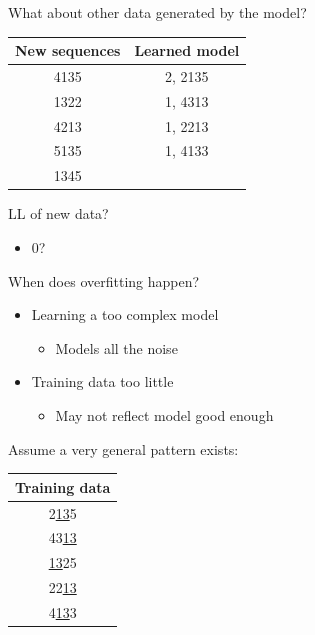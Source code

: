 \begin{frame}
What about other data generated by the model?
\begin{table}[h]
\begin{tabular}{cc}
\textbf{New sequences}     & \multicolumn{1}{l}{\textbf{Learned model}} \\ \hline
\multicolumn{1}{|c|}{4135} & \multicolumn{1}{c|}{2, 2135}                  \\ \hline
\multicolumn{1}{|c|}{1322} & \multicolumn{1}{c|}{1, 4313}                  \\ \hline
\multicolumn{1}{|c|}{4213} & \multicolumn{1}{c|}{1, 2213}                  \\ \hline
\multicolumn{1}{|c|}{5135} & \multicolumn{1}{c|}{1, 4133}                  \\ \hline
\multicolumn{1}{|c|}{1345} & 	\multicolumn{1}{c|}{}						                \\ \hline
\end{tabular}
\end{table}
LL of new data?
\begin{itemize}
\item $0$?
\end{itemize}
\end{frame}

\begin{frame}
When does overfitting happen?
\\
\begin{itemize}
\item Learning a too complex model
	\begin{itemize}
	\item Models all the noise
	\end{itemize}
\item Training data too little
	\begin{itemize}
	\item May not reflect model good enough
	\end{itemize}
\end{itemize}
\end{frame}

\begin{frame}
\center
Assume a very general pattern exists:\\
\vspace{20pt}
\begin{tabular}{c}
\multicolumn{1}{l}{\textbf{Training data}} \\ \hline
\multicolumn{1}{|c|}{2\underline{13}5}    \\ \hline
\multicolumn{1}{|c|}{43\underline{13}}    \\ \hline
\multicolumn{1}{|c|}{\underline{13}25}    \\ \hline
\multicolumn{1}{|c|}{22\underline{13}}    \\ \hline
\multicolumn{1}{|c|}{4\underline{13}3}    \\ \hline
\end{tabular}
\end{frame}

